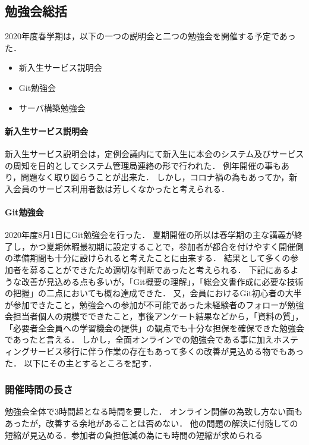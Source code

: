 \subsection*{勉強会総括}


2020年度春学期は，以下の一つの説明会と二つの勉強会を開催する予定であった．

\begin{itemize}
  \item 新入生サービス説明会
  \item Git勉強会
  \item サーバ構築勉強会
\end{itemize}

\paragraph{新入生サービス説明会}
新入生サービス説明会は，定例会議内にて新入生に本会のシステム及びサービスの周知を目的としてシステム管理局連絡の形で行われた．
例年開催の事もあり，問題なく取り図らうことが出来た．
しかし，コロナ禍の為もあってか，新入会員のサービス利用者数は芳しくなかったと考えられる．

\paragraph{Git勉強会}
2020年度8月1日にGit勉強会を行った．
夏期開催の所以は春学期の主な講義が終了し，かつ夏期休暇最初期に設定することで，参加者が都合を付けやすく開催側の準備期間も十分に設けられると考えたことに由来する．
結果として多くの参加者を募ることができたため適切な判断であったと考えられる．
下記にあるような改善が見込める点も多いが，「Git概要の理解」，「総会文書作成に必要な技術の把握」の二点においても概ね達成できた．
又，会員におけるGit初心者の大半が参加できたこと，勉強会への参加が不可能であった未経験者のフォローが勉強会担当者個人の規模でできたこと，事後アンケート結果などから，「資料の質」，「必要者全会員への学習機会の提供」の観点でも十分な担保を確保できた勉強会であったと言える．
しかし，全面オンラインでの勉強会である事に加えホスティングサービス移行に伴う作業の存在もあって多くの改善が見込める物でもあった．
以下にその主とするところを記す．
\subsubsection*{開催時間の長さ}
勉強会全体で3時間超となる時間を要した．
オンライン開催の為致し方ない面もあったが，改善する余地があることは否めない．
他の問題の解決に付随しての短縮が見込める．参加者の負担低減の為にも時間の短縮が求められる
